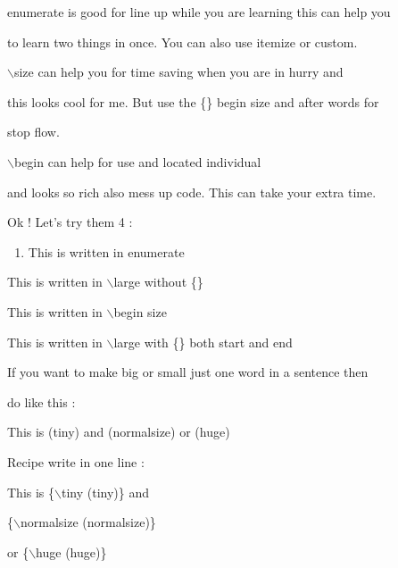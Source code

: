 \documentclass[11pt]{article}
\begin{document}
\vspace{1cm}

enumerate is good for line up while you are learning this can help you

to learn two things in once. You can also use itemize or custom.

\vspace{1cm}

$\backslash$size can help you for time saving when you are in hurry and

this looks cool for me. But use the \{\} begin size and after words for

stop flow.

$\backslash$begin can help for use and located individual 

and looks so rich
also mess up code. This can take your extra time.

\vspace{1cm}

Ok ! Let's try them 4 :

\begin{enumerate}
\item \large{This is written in enumerate}
\end{enumerate}

\large This is written in $\backslash$large without \{\}

\begin{large}
This is written in $\backslash$begin size
\end{large}

{\large This is written in $\backslash$large with \{\} both start and end }

\vspace{1cm}

If you want to make big or small just one word in a sentence then 

do like this :

This is  {\tiny (tiny)} and {\normalsize(normalsize)} or {\huge(huge)}

Recipe write in one line :

This is \{$\backslash$tiny (tiny)\} and 

\{$\backslash$normalsize (normalsize)\}

or \{$\backslash$huge (huge)\}

\vspace{1cm}
\end{document}
